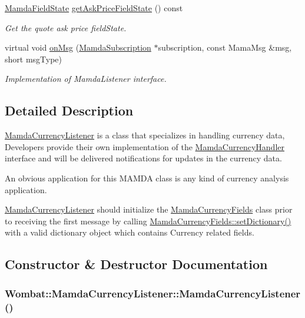 \begin{CompactItemize}
\hyperlink{namespaceWombat_93aac974f2ab713554fd12a1fa3b7d2a}{Mamda\-Field\-State} \hyperlink{classWombat_1_1MamdaCurrencyListener_485502d95a2b9f71119353b736719d57}{get\-Ask\-Price\-Field\-State} () const 
\begin{CompactList}\small\item\em Get the quote ask price field\-State. \item\end{CompactList}\item 
virtual void \hyperlink{classWombat_1_1MamdaCurrencyListener_0cc612d96663c187bab76d284912dbfe}{on\-Msg} (\hyperlink{classWombat_1_1MamdaSubscription}{Mamda\-Subscription} $\ast$subscription, const Mama\-Msg \&msg, short msg\-Type)
\begin{CompactList}\small\item\em Implementation of Mamda\-Listener interface. \item\end{CompactList}\end{CompactItemize}


\subsection{Detailed Description}
\hyperlink{classWombat_1_1MamdaCurrencyListener}{Mamda\-Currency\-Listener} is a class that specializes in handling currency data, Developers provide their own implementation of the \hyperlink{classWombat_1_1MamdaCurrencyHandler}{Mamda\-Currency\-Handler} interface and will be delivered notifications for updates in the currency data. 

An obvious application for this MAMDA class is any kind of currency analysis application.

\hyperlink{classWombat_1_1MamdaCurrencyListener}{Mamda\-Currency\-Listener} should initialize the \hyperlink{classWombat_1_1MamdaCurrencyFields}{Mamda\-Currency\-Fields} class prior to receiving the first message by calling \hyperlink{classWombat_1_1MamdaCurrencyFields_b8f7dae141b38d0f2fb8559cbdc5d2ac}{Mamda\-Currency\-Fields::set\-Dictionary()} with a valid dictionary object which contains Currency related fields. 



\subsection{Constructor \& Destructor Documentation}
\hypertarget{classWombat_1_1MamdaCurrencyListener_331d5b71016ebdcdd47de7ff9ded97d2}{
\subsubsection[MamdaCurrencyListener]{\setlength{\rightskip}{0pt plus 5cm}Wombat::Mamda\-Currency\-Listener::Mamda\-Currency\-Listener ()}}
\label{classWombat_1_1MamdaCurrencyListener_331d5b71016ebdcdd47de7ff9ded97d2}


